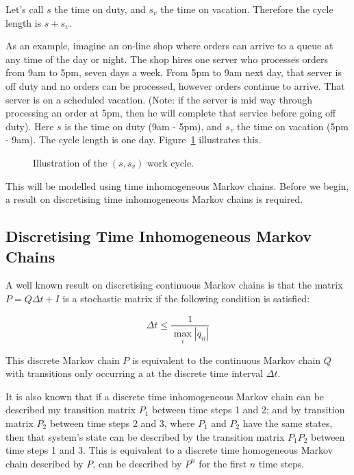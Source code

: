 \documentclass{article}
\begin{document}
Let’s call $s$ the time on duty, and $s_v$ the time on vacation.
Therefore the cycle length is $s + s_v$.

As an example, imagine an on-line shop where orders can arrive to a queue at any time of the day or night.
The shop hires one server who processes orders from 9am to 5pm, seven days a week.
From 5pm to 9am next day, that server is off duty and no orders can be processed, however orders continue to arrive.
That server is on a scheduled vacation.
(Note: if the server is mid way through processing an order at 5pm, then he will complete that service before going off duty).
Here $s$ is the time on duty (9am - 5pm), and $s_v$ the time on vacation (5pm - 9am).
The cycle length is one day.
Figure~\ref{fig:onoffdutycycle} illustrates this.

\begin{figure}[!hbtp]
\begin{center}
  
  \caption{Illustration of the $(s, s_v)$ work cycle.}
  \label{fig:onoffdutycycle}
\end{center}
\end{figure}

This will be modelled using time inhomogeneous Markov chains.
Before we begin, a result on discretising time inhomogeneous Markov chains is required.

\subsection{Discretising Time Inhomogeneous Markov Chains}

A well known result \cite{stewart09} on discretising continuous Markov chains is that the matrix $P = Q \Delta t + I$ is a stochastic matrix if the following condition is satisfied:

\begin{equation}
\Delta t \leq \frac{1}{\max_i |q_{ii}|}
\end{equation}

This discrete Markov chain $P$ is equivalent to the continuous Markov chain $Q$ with transitions only occurring a at the discrete time interval $\Delta t$.

It is also known that if a discrete time inhomogeneous Markov chain can be described my transition matrix $P_1$ between time steps 1 and 2; and by transition matrix $P_2$  between time steps 2 and 3, where $P_1$ and $P_2$ have the same states, then that system's state can be described by the transition matrix $P_1 P_2$ between time steps 1 and 3.
This is equivalent to a discrete time homogeneous Markov chain described by $P$, can be described by $P^n$ for the first $n$ time steps.
\end{document}
